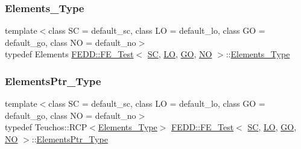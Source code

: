 \mbox{\label{classFEDD_1_1FE__Test_a73f1a4ecb41cbeec1be473d71efe022d}} 
\subsubsection{\texorpdfstring{Elements\+\_\+\+Type}{Elements\_Type}}
{\footnotesize\ttfamily template$<$class SC  = default\+\_\+sc, class LO  = default\+\_\+lo, class GO  = default\+\_\+go, class NO  = default\+\_\+no$>$ \\
typedef Elements \hyperlink{classFEDD_1_1FE__Test}{F\+E\+D\+D\+::\+F\+E\+\_\+\+Test}$<$ \hyperlink{fe__test__laplace_8cpp_a79c7e86a57edbb2a5a53242bcd04e41e}{SC}, \hyperlink{fe__test__laplace_8cpp_ad6a38c9f07d3fd633eefca5bccad8410}{LO}, \hyperlink{fe__test__laplace_8cpp_afa2946b509009b4f45eb04bd8c5b27d9}{GO}, \hyperlink{fe__test__laplace_8cpp_a5e24f37b28787429872b6ecb1d0417ce}{NO} $>$\+::\hyperlink{classFEDD_1_1FE__Test_a73f1a4ecb41cbeec1be473d71efe022d}{Elements\+\_\+\+Type}}

\mbox{\label{classFEDD_1_1FE__Test_af8f5bc3cb82c5d60a3a63b1e5c89a678}} 
\subsubsection{\texorpdfstring{Elements\+Ptr\+\_\+\+Type}{ElementsPtr\_Type}}
{\footnotesize\ttfamily template$<$class SC  = default\+\_\+sc, class LO  = default\+\_\+lo, class GO  = default\+\_\+go, class NO  = default\+\_\+no$>$ \\
typedef Teuchos\+::\+R\+CP$<$\hyperlink{classFEDD_1_1FE__Test_a73f1a4ecb41cbeec1be473d71efe022d}{Elements\+\_\+\+Type}$>$ \hyperlink{classFEDD_1_1FE__Test}{F\+E\+D\+D\+::\+F\+E\+\_\+\+Test}$<$ \hyperlink{fe__test__laplace_8cpp_a79c7e86a57edbb2a5a53242bcd04e41e}{SC}, \hyperlink{fe__test__laplace_8cpp_ad6a38c9f07d3fd633eefca5bccad8410}{LO}, \hyperlink{fe__test__laplace_8cpp_afa2946b509009b4f45eb04bd8c5b27d9}{GO}, \hyperlink{fe__test__laplace_8cpp_a5e24f37b28787429872b6ecb1d0417ce}{NO} $>$\+::\hyperlink{classFEDD_1_1FE__Test_af8f5bc3cb82c5d60a3a63b1e5c89a678}{Elements\+Ptr\+\_\+\+Type}}

